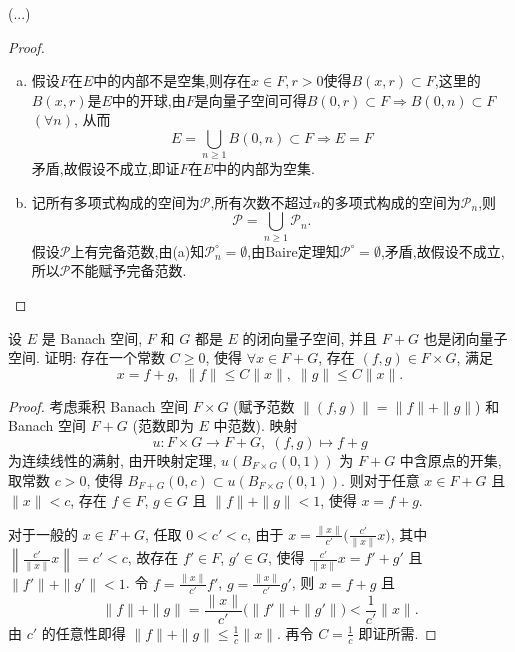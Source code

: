 \begin{exercise}[13]
  (...)
\end{exercise}

\begin{proof}
  \begin{enumerate}[(a)]
    \item 假设$F$在$E$中的内部不是空集,则存在$x\in F,r>0$使得$B(x,r)\subset F$,这里的$B(x,r)$是$E$中的开球,由$F$是向量子空间可得$B(0,r)\subset F\Rightarrow B(0,n)\subset F$ $(\forall n)$, 从而
    \[E=\bigcup_{n\geq 1}B(0,n)\subset F\Rightarrow E=F\]
    矛盾,故假设不成立,即证$F$在$E$中的内部为空集.
    \item 记所有多项式构成的空间为$\mathcal{P}$,所有次数不超过$n$的多项式构成的空间为$\mathcal{P}_n$,则
    \[\mathcal{P}=\bigcup_{n\geq 1}\mathcal{P}_n.\]
    假设$\mathcal{P}$上有完备范数,由(a)知$\mathcal{P}_n^{\circ}=\emptyset$,由Baire定理知$\mathcal{P}^{\circ}=\emptyset$,矛盾,故假设不成立,所以$\mathcal{P}$不能赋予完备范数. \qedhere
  \end{enumerate}
\end{proof}


\begin{exercise}[14]
    设 $E$ 是 Banach 空间, $F$ 和 $G$ 都是 $E$ 的闭向量子空间, 并且 $F+G$
    也是闭向量子空间. 证明: 存在一个常数 $C\geq 0$, 使得 $\forall x\in F+G$,
    存在 $(f,g)\in F\times G$, 满足
    \[x=f+g,\;\|f\|\leq C\|x\|,\;\|g\|\leq C\|x\|.\]
\end{exercise}

\begin{proof}
    考虑乘积 Banach 空间 $F\times G$ (赋予范数 $\|(f,g)\|=\|f\|+\|g\|$)
    和 Banach 空间 $F+G$ (范数即为 $E$ 中范数). 映射
    \[u:F\times G\to F+G,\;(f,g)\mapsto f+g\]
    为连续线性的满射, 由开映射定理, $u(B_{F\times G}(0,1))$ 为 $F+G$ 中含原点的开集,
    取常数 $c>0$, 使得 $B_{F+G}(0,c)\subset u(B_{F\times G}(0,1))$.
    则对于任意 $x\in F+G$ 且 $\|x\|<c$, 存在 $f\in F$, $g\in G$
    且 $\|f\|+\|g\|<1$, 使得 $x=f+g$.

    对于一般的 $x\in F+G$, 任取 $0<c'<c$, 由于 $x=\frac{\|x\|}{c'}\bigl(\frac{c'}{\|x\|}x\bigr)$,
    其中 $\left\|\frac{c'}{\|x\|}x\right\|=c'<c$, 故存在 $f'\in F$, $g'\in G$,
    使得 $\frac{c'}{\|x\|}x=f'+g'$ 且 $\|f'\|+\|g'\|<1$.
    令 $f=\frac{\|x\|}{c'}f'$, $g=\frac{\|x\|}{c'}g'$, 则
    $x=f+g$ 且
    \[\|f\|+\|g\|=\frac{\|x\|}{c'}\bigl(\|f'\|+\|g'\|\bigr)<\frac{1}{c'}\|x\|.\]
    由 $c'$ 的任意性即得 $\|f\|+\|g\|\leq\frac{1}{c}\|x\|$.
    再令 $C=\frac{1}{c}$ 即证所需.
\end{proof}




